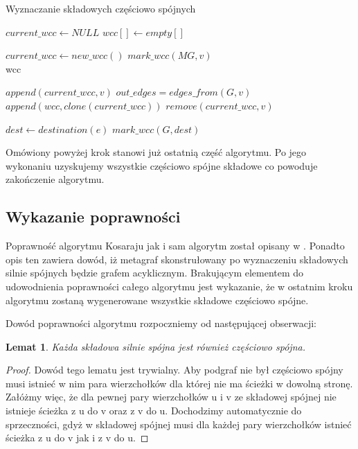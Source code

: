 \documentclass[a4paper,10pt]{article}
\newtheorem{lem}[twr]{Lemat}
\begin{document}
\begin{algorithm}
\caption{Wyznaczanie składowych częściowo spójnych}
\begin{algorithmic}
\State $current\_wcc \leftarrow NULL $
\State $wcc[] \leftarrow empty[] $

    \State $current\_wcc \leftarrow new\_wcc() $
    \State $mark\_wcc(MG, v)$
  \EndIf
\EndFor\\
\Return wcc
\EndFunction

  \State $append(current\_wcc, v)$
  \State $out\_edges = edges\_from(G, v)$
    \State $append(wcc, clone(current\_wcc))$
    \State $remove(current\_wcc, v)$

    \Return
  \EndIf

    \State $dest \leftarrow destination(e)$
    \State $mark\_wcc(G, dest)$
  \EndFor

\EndFunction
\end{algorithmic}
\end{algorithm}


Omówiony powyżej krok stanowi już ostatnią część algorytmu. Po jego
wykonaniu uzyskujemy wszystkie częściowo spójne składowe co powoduje
zakończenie algorytmu.

\subsection{Wykazanie poprawności}

Poprawność algorytmu Kosaraju jak i sam algorytm został opisany w
\cite[rozdz. 23.5]{Cormen}. Ponadto opis ten zawiera dowód, iż
metagraf skonstrułowany po wyznaczeniu składowych silnie spójnych
będzie grafem acyklicznym. Brakującym elementem do udowodnienia
poprawności całego algorytmu jest wykazanie, że w ostatnim kroku
algorytmu zostaną wygenerowane wszystkie składowe częściowo spójne.

Dowód poprawności algorytmu rozpoczniemy od następującej obserwacji:

\begin{lem}
\label{silnie czesciowo}
Każda składowa silnie spójna jest również częściowo spójna.
\end{lem}

\begin{proof}
  Dowód tego lematu jest trywialny. Aby podgraf nie był częściowo
  spójny musi istnieć w nim para wierzchołków dla której nie ma ścieżki
  w dowolną stronę. Załóżmy więc, że dla pewnej pary wierzchołków u i v
  ze składowej spójnej nie istnieje ścieżka z u do v oraz z v do
  u. Dochodzimy automatycznie do sprzeczności, gdyż w składowej
  spójnej musi dla każdej pary wierzchołków istnieć ścieżka z u do v
  jak i z v do u.
\end{proof}
\end{document}
